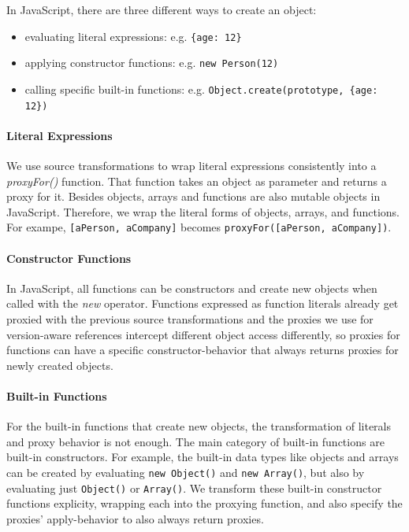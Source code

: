 In JavaScript, there are three different ways to create an object: 
\begin{itemize}
    \item evaluating literal expressions: e.g. \lstinline|{age: 12}|
    \item applying constructor functions: e.g. \lstinline|new Person(12)|
    \item calling specific built-in functions: e.g. \lstinline|Object.create(prototype, {age: 12})|
\end{itemize}

\paragraph{Literal Expressions}
We use source transformations to wrap literal expressions consistently into a \emph{proxyFor()} function.
That function takes an object as parameter and returns a proxy for it.
Besides objects, arrays and functions are also mutable objects in JavaScript.
Therefore, we wrap the literal forms of objects, arrays, and functions.
For exampe, \lstinline{[aPerson, aCompany]} becomes \lstinline{proxyFor([aPerson, aCompany])}.

\paragraph{Constructor Functions} 
In JavaScript, all functions can be constructors and create new objects when called with the \emph{new} operator.
Functions expressed as function literals already get proxied with the previous source transformations and the proxies we use for version-aware references intercept different object access differently, so proxies for functions can have a specific constructor-behavior that always returns proxies for newly created objects.

\paragraph{Built-in Functions}
For the built-in functions that create new objects, the transformation of literals and proxy behavior is not enough.
The main category of built-in functions are built-in constructors.
For example, the built-in data types like objects and arrays can be created by evaluating \lstinline{new Object()} and \lstinline{new Array()}, but also by evaluating just \lstinline{Object()} or \lstinline{Array()}.
We transform these built-in constructor functions explicity, wrapping each into the proxying function, and also specify the proxies' apply-behavior to also always return proxies.

